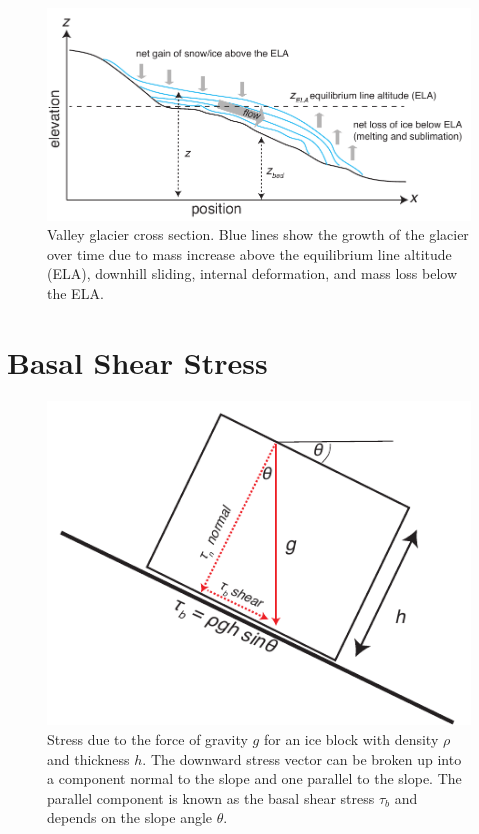 \documentclass[11pt, oneside]{article}   	%
\begin{document}
\begin{figure}[htbp]
\begin{center}
\includegraphics[width=.8\textwidth]{glacier.pdf}
\caption{Valley glacier cross section. Blue lines show the growth of the glacier over time due to mass increase above the equilibrium line altitude (ELA), downhill sliding, internal deformation,  and mass loss below the ELA. }
\label{default}
\end{center}
\end{figure}

\section*{Basal Shear Stress} 

\begin{figure}[htbp]
\begin{center}
\includegraphics[width=.6\textwidth]{basal.pdf}
\caption{Stress due to the force of gravity $g$ for an ice block with density $\rho$ and thickness $h$.  The downward stress vector can be broken up into a component normal to the slope and one parallel to the slope. The parallel component is known as the basal shear stress $\tau_b$ and depends on the slope angle $\theta$.}
\label{fig:Basal}
\end{center}
\end{figure}
\end{document}
